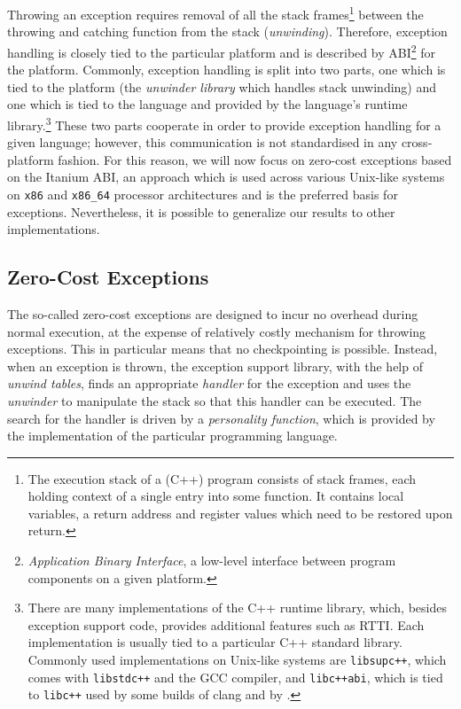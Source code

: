 Throwing an exception requires removal of all the stack frames\footnote{The
  execution stack of a (C++) program consists of stack frames, each
  holding context of a single entry into some function. It contains
  local variables, a return address and register values which need to be
  restored upon return.} between the throwing and catching function from
the stack (\emph{unwinding}). Therefore, exception handling is closely
tied to the particular platform and is described by ABI\footnote{\emph{Application
  Binary Interface}, a low-level interface between program components on
  a given platform.} for the platform. Commonly, exception handling is
split into two parts, one which is tied to the platform (the
\emph{unwinder library} which handles stack unwinding) and one which is
tied to the language and provided by the language's runtime
library.\footnote{There are many implementations of the C++ runtime
  library, which, besides exception support code, provides additional
  features such as RTTI. Each implementation is usually tied to a
  particular C++ standard library. Commonly used implementations on
  Unix-like systems are \texttt{libsupc++}, which comes with
  \texttt{libstdc++} and the GCC compiler, and \texttt{libc++abi}, which
  is tied to \texttt{libc++} used by some builds of clang and by \divine{}.}
These two parts cooperate in order to provide exception handling for a
given language; however, this communication is not standardised in any
cross-platform fashion. For this reason, we will now focus on zero-cost
exceptions based on the Itanium ABI, an approach which is used across
various Unix-like systems on \texttt{x86} and \texttt{x86\_64} processor
architectures and is the preferred basis for \llvm{} exceptions.
Nevertheless, it is possible to generalize our results to other
implementations.

\subsection{Zero-Cost Exceptions}\label{sec:zerocost}

The so-called zero-cost exceptions are designed to incur no overhead
during normal execution, at the expense of relatively costly mechanism
for throwing exceptions. This in particular means that no checkpointing
is possible. Instead, when an exception is thrown, the exception support
library, with the help of \emph{unwind tables}, finds an appropriate
\emph{handler} for the exception and uses the \emph{unwinder} to
manipulate the stack so that this handler can be executed. The search
for the handler is driven by a \emph{personality function}, which is
provided by the implementation of the particular programming language.

